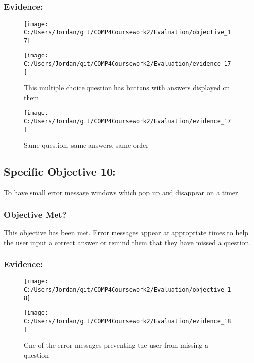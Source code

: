 \subsubsection{Evidence: }

\begin{figure}[H]
	\texttt{[image: C:/Users/Jordan/git/COMP4Coursework2/Evaluation/objective\_17]}
\end{figure}

\begin{figure}[H]
	\texttt{[image: C:/Users/Jordan/git/COMP4Coursework2/Evaluation/evidence\_17]}
	\caption{This multiple choice question has buttons with answers displayed on them}
\end{figure}

\begin{figure}[H]
	\texttt{[image: C:/Users/Jordan/git/COMP4Coursework2/Evaluation/evidence\_17]}
	\caption{Same question, same answers, same order}
\end{figure}

\subsection{Specific Objective 10: }

To have small error message windows which pop up and disappear on a timer

\subsubsection{Objective Met?}

This objective has been met. Error messages appear at appropriate times to help the user input a correct answer or remind them that they have missed a question.

\subsubsection{Evidence: }

\begin{figure}[H]
	\texttt{[image: C:/Users/Jordan/git/COMP4Coursework2/Evaluation/objective\_18]}
\end{figure}

\begin{figure}[H]
	\texttt{[image: C:/Users/Jordan/git/COMP4Coursework2/Evaluation/evidence\_18]}
	\caption{One of the error messages preventing the user from missing a question}
\end{figure}

